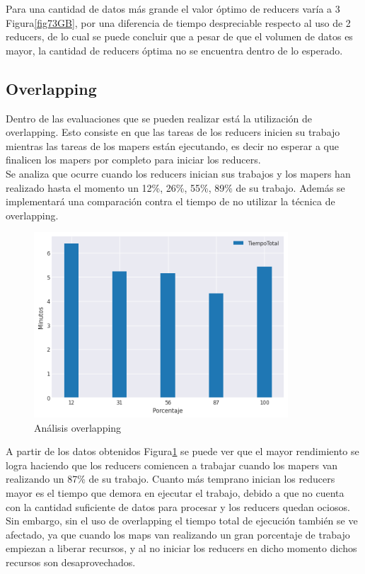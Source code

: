 \documentclass[conference]{IEEEtran}
\begin{document}
Para una cantidad de datos más grande el valor óptimo de reducers varía a 3 Figura\ref{fig73GB}, por una diferencia de tiempo despreciable respecto al uso de 2 reducers, de lo cual se puede concluir que a pesar de que el volumen de datos es mayor, la cantidad de reducers óptima no se encuentra dentro de lo esperado.

\subsection{Overlapping}\label{AA}

Dentro de las evaluaciones que se pueden realizar está la utilización de overlapping. Esto consiste en que las tareas de los reducers inicien su trabajo mientras las tareas de los mapers están ejecutando, es decir no esperar a que finalicen los mapers por completo para iniciar los reducers.\\

Se analiza que ocurre cuando los reducers inician sus trabajos y los mapers han realizado hasta el momento un 12\%, 26\%, 55\%, 89\% de su trabajo. Además se implementará una comparación contra el tiempo de no utilizar la técnica de overlapping.

\begin{figure}[htbp]
\centerline{\includegraphics[width=95mm]{Pictures/Overlapping.png}}
\caption{Análisis overlapping}
\label{figOver}
\end{figure}

A partir de los datos obtenidos Figura\ref{figOver} se puede ver que el mayor rendimiento se logra haciendo que los reducers comiencen a trabajar cuando los mapers van realizando un 87\% de su trabajo. Cuanto más temprano inician los reducers mayor es el tiempo que demora en ejecutar el trabajo, debido a que no cuenta con la cantidad suficiente de datos para procesar y los reducers quedan ociosos. Sin embargo, sin el uso de overlapping el tiempo total de ejecución también se ve afectado, ya que cuando los maps van realizando un gran porcentaje de trabajo empiezan a liberar recursos, y al no iniciar los reducers en dicho momento dichos recursos son desaprovechados.
\end{document}
